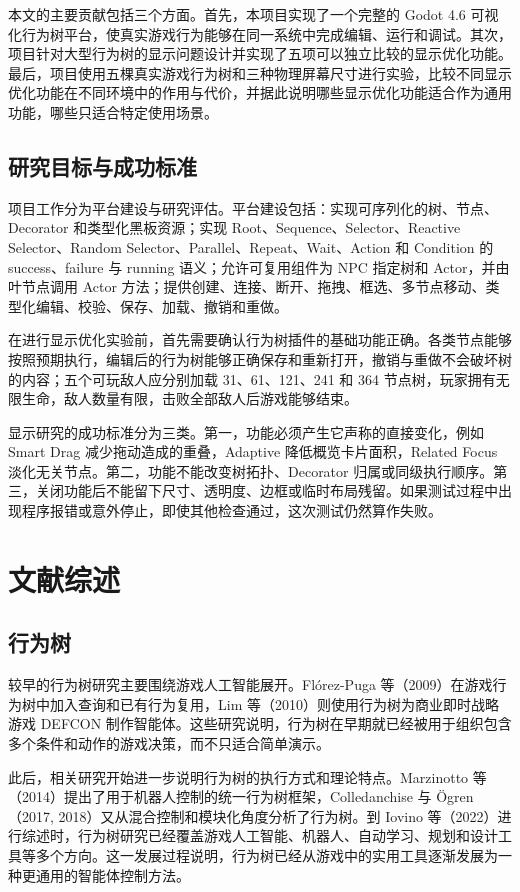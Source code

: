 \documentclass[11pt,a4paper,oneside,extrafontsizes]{memoir}
\begin{document}
本文的主要贡献包括三个方面。首先，本项目实现了一个完整的 Godot 4.6 可视化行为树平台，使真实游戏行为能够在同一系统中完成编辑、运行和调试。其次，项目针对大型行为树的显示问题设计并实现了五项可以独立比较的显示优化功能。最后，项目使用五棵真实游戏行为树和三种物理屏幕尺寸进行实验，比较不同显示优化功能在不同环境中的作用与代价，并据此说明哪些显示优化功能适合作为通用功能，哪些只适合特定使用场景。

\section{研究目标与成功标准}

项目工作分为平台建设与研究评估。平台建设包括：实现可序列化的树、节点、Decorator 和类型化黑板资源；实现 Root、Sequence、Selector、Reactive Selector、Random Selector、Parallel、Repeat、Wait、Action 和 Condition 的 success、failure 与 running 语义；允许可复用组件为 NPC 指定树和 Actor，并由叶节点调用 Actor 方法；提供创建、连接、断开、拖拽、框选、多节点移动、类型化编辑、校验、保存、加载、撤销和重做。

在进行显示优化实验前，首先需要确认行为树插件的基础功能正确。各类节点能够按照预期执行，编辑后的行为树能够正确保存和重新打开，撤销与重做不会破坏树的内容；五个可玩敌人应分别加载 31、61、121、241 和 364 节点树，玩家拥有无限生命，敌人数量有限，击败全部敌人后游戏能够结束。

显示研究的成功标准分为三类。第一，功能必须产生它声称的直接变化，例如 Smart Drag 减少拖动造成的重叠，Adaptive 降低概览卡片面积，Related Focus 淡化无关节点。第二，功能不能改变树拓扑、Decorator 归属或同级执行顺序。第三，关闭功能后不能留下尺寸、透明度、边框或临时布局残留。如果测试过程中出现程序报错或意外停止，即使其他检查通过，这次测试仍然算作失败。

\chapter{文献综述}

\section{行为树}

较早的行为树研究主要围绕游戏人工智能展开。Flórez-Puga 等（2009）在游戏行为树中加入查询和已有行为复用，Lim 等（2010）则使用行为树为商业即时战略游戏 DEFCON 制作智能体。这些研究说明，行为树在早期就已经被用于组织包含多个条件和动作的游戏决策，而不只适合简单演示。

此后，相关研究开始进一步说明行为树的执行方式和理论特点。Marzinotto 等（2014）提出了用于机器人控制的统一行为树框架，Colledanchise 与 Ögren（2017, 2018）又从混合控制和模块化角度分析了行为树。到 Iovino 等（2022）进行综述时，行为树研究已经覆盖游戏人工智能、机器人、自动学习、规划和设计工具等多个方向。这一发展过程说明，行为树已经从游戏中的实用工具逐渐发展为一种更通用的智能体控制方法。
\end{document}

